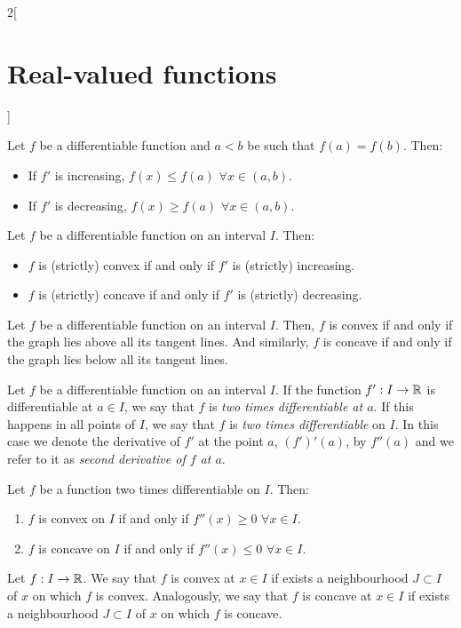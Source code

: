 \documentclass[../../../main_math.tex]{subfiles}
\begin{document}
\begin{multicols}{2}[\section{Real-valued functions}]
\begin{lemma}
    Let $f$ be a differentiable function and $a<b$ be such that $f(a)=f(b)$. Then:
    \begin{itemize}
      \item If $f'$ is increasing, $f(x)\leq f(a)$ $\forall x\in(a,b)$.
      \item If $f'$ is decreasing, $f(x)\geq f(a)$ $\forall x\in(a,b)$.
    \end{itemize}
  \end{lemma}
  \begin{theorem}
    Let $f$ be a differentiable function on an interval $I$. Then:
    \begin{itemize}
      \item $f$ is (strictly) convex if and only if $f'$ is (strictly) increasing.
      \item $f$ is (strictly) concave if and only if $f'$ is (strictly) decreasing.
    \end{itemize}
  \end{theorem}
  \begin{theorem}
    Let $f$ be a differentiable function on an interval $I$. Then, $f$ is convex if and only if the graph lies above all its tangent lines. And similarly, $f$ is concave if and only if the graph lies below all its tangent lines.
  \end{theorem}
  \begin{definition}\label{RVF:second-derivative}
    Let $f$ be a differentiable function on an interval $I$. If the function $f':I\rightarrow\mathbb{R}$ is differentiable at $a\in I$, we say that $f$ is \emph{two times differentiable at $a$}. If this happens in all points of $I$, we say that $f$ is \emph{two times differentiable} on $I$. In this case we denote the derivative of $f'$ at the point $a$, $(f')'(a)$, by $f''(a)$ and we refer to it as \emph{second derivative of $f$ at $a$}.
  \end{definition}
  \begin{theorem}
    Let $f$ be a function two times differentiable on $I$. Then:
    \begin{enumerate}
      \item $f$ is convex on $I$ if and only if $f''(x)\geq 0$ $\forall x\in I$.
      \item $f$ is concave on $I$ if and only if $f''(x)\leq 0$ $\forall x\in I$.
    \end{enumerate}
  \end{theorem}
  \begin{definition}
    Let $f:I\rightarrow\mathbb{R}$. We say that $f$ is convex at $x\in I$ if exists a neighbourhood $J\subset I$ of $x$ on which $f$ is convex. Analogously, we say that $f$ is concave at $x\in I$ if exists a neighbourhood $J\subset I$ of $x$ on which $f$ is concave.

\end{definition}
\end{multicols}
\end{document}
